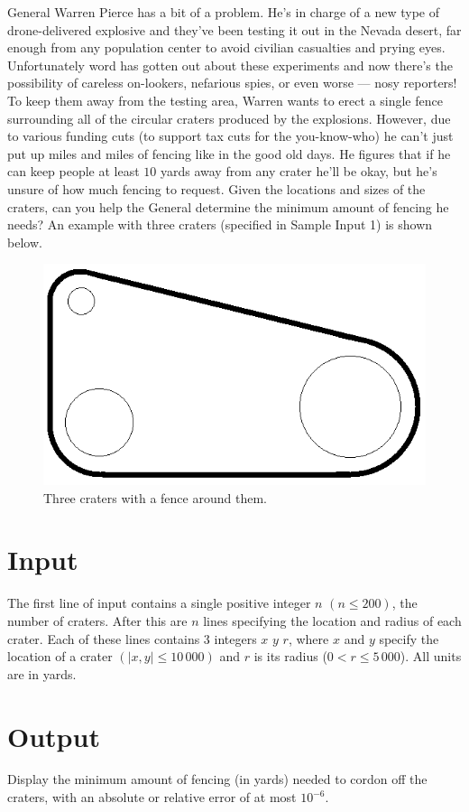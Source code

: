 General Warren Pierce has a bit of a problem.  He's in charge of a new type
of drone-delivered explosive and they've been testing it out in the Nevada
desert, far enough from any population center to avoid civilian casualties
and prying eyes.
Unfortunately word has gotten out about these experiments and now there's the
possibility of careless on-lookers, nefarious spies, or even worse --- nosy
reporters!
To keep them away from the testing area, Warren wants to erect a single fence
surrounding all of the circular craters produced by the explosions.
However, due to various funding cuts (to
support tax cuts for the you-know-who) he can't just put up miles and miles of
fencing like in the good old days. He figures that if he can keep people at
least $10$ yards away from any crater he'll be okay, but he's unsure of how much
fencing to request.  Given the locations and sizes of the craters, can you
help the General determine the minimum amount of fencing he needs?  An
example with three craters (specified in Sample Input 1) is shown below.

\begin{figure}[!h]
\centering
  \includegraphics{crater}
  \vspace{-3pt}%
  \caption{Three craters with a fence around them.}
  \label{craters_1}
\end{figure}

\section*{Input}
The first line of input contains a single positive integer $n$ $(n \leq 200)$,
the number of craters.  After this are $n$ lines specifying the location and
radius of each crater.  Each of these lines contains 3 integers $x$ $y$ $r$,
where $x$ and $y$ specify the location of a crater $(|x,y| \leq 10\,000)$ and $r$
is its radius ($0 < r \leq 5\,000$).  All units are in yards.


\section*{Output}
Display the minimum amount of fencing (in yards) needed to cordon off the
craters, with an absolute or relative error of at most $10^{-6}$.
